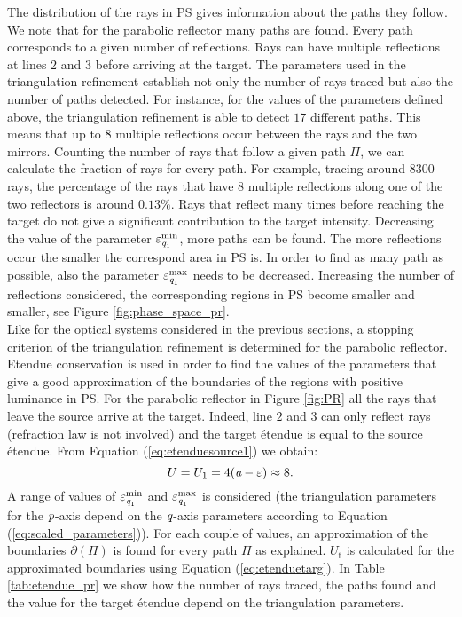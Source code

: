 \begin{figure}[h]
\end{figure} The distribution of the rays in PS gives information about the paths they follow. We note that for the parabolic reflector many paths are found. Every path corresponds to a given number of reflections. Rays can have multiple reflections at lines $2$ and $3$ before arriving at the target. The parameters used in the triangulation refinement establish not only the number of rays traced but also the number of paths detected. For instance, for the values of the parameters defined above, the triangulation refinement is able to detect $17$ different paths. This means that up to $8$ multiple reflections occur between the rays and the two mirrors. Counting the number of rays that follow a given path $\Pi$, we can calculate the fraction of rays for every path. For example, tracing around $8300$ rays, the percentage of the rays that have $8$ multiple reflections along one of the two reflectors is around $0.13\%$. Rays that reflect many times before reaching the target do not give a significant contribution to the target intensity. Decreasing the value of the parameter $\varepsilon_{\textit{q}_1}^{\textrm{min}}$, more paths can be found. The more reflections occur the smaller the correspond area in PS is. In order to find as many path as possible, also the parameter $\varepsilon_{\textit{q}_1}^{\textrm{max}}$ needs to be decreased. Increasing the number of reflections considered, the corresponding regions in PS become smaller and smaller, see Figure \ref{fig:phase_space_pr}. \\ \indent Like for the optical systems considered in the previous sections, a stopping criterion of the triangulation refinement is determined for the parabolic reflector. Etendue conservation is used in order to find the values of the parameters that give a good approximation of the boundaries of the regions with positive luminance in PS. For the parabolic reflector in Figure \ref{fig:PR} all the rays that leave the source arrive at the target. Indeed, line $2$ and $3$ can only reflect rays (refraction law is not involved) and the target \'{e}tendue is equal to the source \'{e}tendue. From Equation (\ref{eq:etenduesource1}) we obtain:
\begin{equation}
U = U_1 = 4(\textit{a}-\varepsilon)\approx 8.
\end{equation}
A range of values of $\varepsilon_{\textit{q}_1}^{\textrm{min}}$ and $\varepsilon_{\textit{q}_1}^{\textrm{max}}$ is considered (the triangulation parameters for the $\textit{p}$-axis depend on the $\textit{q}$-axis parameters according to Equation (\ref{eq:scaled_parameters})). For each couple of values, an approximation of the boundaries $\partial$$(\Pi)$ is found for every path $\Pi$ as explained. $U_{\textrm{t}}$ is calculated for the approximated boundaries using Equation (\ref{eq:etenduetarg}). In Table \ref{tab:etendue_pr} we show how the number of rays traced, the paths found and the value for the target \'{e}tendue depend on the triangulation parameters.
